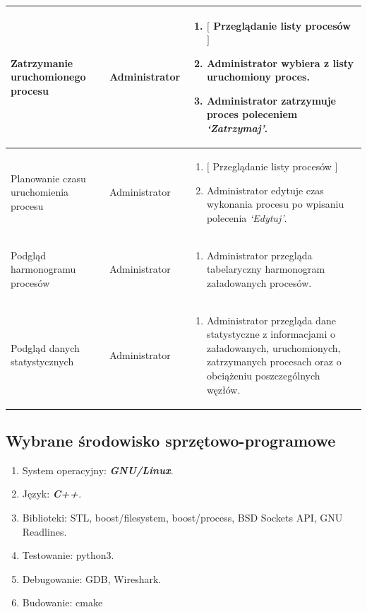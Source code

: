 \documentclass[paper=a4, fontsize=11pt]{scrartcl} %
\begin{document}
\begin{longtable}{ |m{4.5cm}|m{3cm}|m{7.5cm}|}
 \hline
Zatrzymanie uruchomionego procesu & Administrator & 
\begin{enumerate}
\item $[$ Przeglądanie listy procesów $]$
\item Administrator wybiera z listy uruchomiony proces.
\item Administrator zatrzymuje proces poleceniem \textit{‘Zatrzymaj’}.
\end{enumerate} \\
 \hline
Planowanie czasu uruchomienia procesu & Administrator & 
\begin{enumerate}
\item $[$ Przeglądanie listy procesów $]$
\item Administrator edytuje czas wykonania procesu po wpisaniu polecenia \textit{‘Edytuj’}.
\end{enumerate} \\
 \hline
Podgląd harmonogramu procesów & Administrator & 
\begin{enumerate}
\item Administrator przegląda tabelaryczny harmonogram załadowanych procesów.
\end{enumerate} \\
 \hline
Podgląd danych statystycznych & Administrator & 
\begin{enumerate}
\item Administrator przegląda dane statystyczne z informacjami o załadowanych, uruchomionych, zatrzymanych procesach oraz o obciążeniu poszczególnych węzłów.
\end{enumerate} \\
 \hline
\end{longtable}

\subsection{Wybrane środowisko sprzętowo-programowe} 
\begin{enumerate}
\item System operacyjny: \textit{\textbf{GNU/Linux}}.
\item Język: \textit{\textbf{C++}}.
\item Biblioteki: STL, boost/filesystem, boost/process, BSD Sockets API, GNU Readlines.
\item Testowanie: python3.
\item Debugowanie: GDB, Wireshark.
\item Budowanie: cmake
\end{enumerate}
\end{document}
